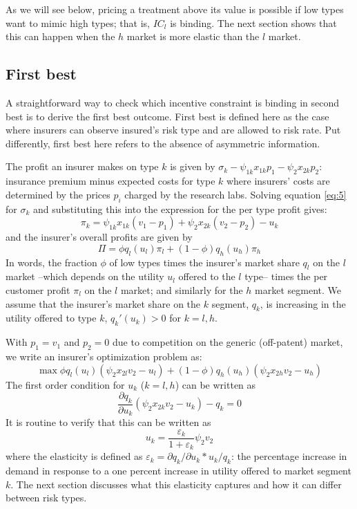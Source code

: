 \documentclass[a4paper,12pt]{article}
\begin{document}
As we will see below, pricing a treatment above its value is possible if low types want to mimic high types; that is, \(IC_l\) is binding. The next section shows that this can happen when the \(h\) market is more elastic than the \(l\) market.

\subsection{First best}
\label{sec:org7e55ff0}

A straightforward way to check which incentive constraint is binding in second best is to derive the first best outcome. First best is defined here as the case where insurers can observe insured's risk type and are allowed to risk rate. Put differently, first best here refers to the absence of asymmetric information.

The profit an insurer makes on type \(k\) is given by \(\sigma_k - \psi_{1k}x_{1k}p_1 - \psi_{2}x_{2k}p_2\): insurance premium minus expected costs for type \(k\) where insurers' costs are determined by the prices \(p_{i}\) charged by the research labs. Solving equation \eqref{eq:5} for \(\sigma_{k}\) and substituting this into the expression for the per type profit gives:
\begin{equation}
\label{eq:6}
\pi_k = \psi_{1k}x_{1k}(v_1-p_1)+\psi_{2}x_{2k}(v_2-p_2)-u_k
\end{equation}
and the insurer's overall profits are given by
\begin{equation}
\label{eq:7}
\Pi = \phi q_l(u_l) \pi_l +(1-\phi)q_h(u_h) \pi_h
\end{equation}
In words, the fraction \(\phi\) of low types times the insurer's market share \(q_l\) on the \(l\) market --which depends on the utility \(u_l\) offered to the \(l\) type-- 
times the per customer profit \(\pi_l\) on the \(l\) market; and similarly for the \(h\) market segment. We assume that the insurer's market share on the \(k\) segment, \(q_k\), is increasing in the utility offered to type \(k\), \(q_k'(u_k)>0\) for \(k=l,h\). 

With \(p_1=v_1\) and \(p_2=0\) due to competition on the generic (off-patent) market, we write an insurer's optimization problem as:
\begin{equation}
\max \phi q_l(u_l) (\psi_2 x_{2l} v_2 -u_l) + (1-\phi) q_h(u_h) (\psi_2 x_{2h} v_2 -u_h)
\end{equation}
The first order condition for \(u_k\) (\(k=l,h\)) can be written as
\begin{equation}
\frac{\partial q_{k}}{\partial u_{k}} (\psi_2 x_{2k} v_2 - u_k) - q_k = 0
\end{equation}
It is routine to verify that this can be written as
\begin{equation}
\label{eq:elastEquation}
u_k = \frac{\varepsilon_{k}}{1+\varepsilon_{k}}\psi_2 v_2
\end{equation}
where the elasticity is defined as \(\varepsilon_k = \partial q_k/\partial u_k * u_k/q_k\): the percentage increase in demand in response to a one percent increase in utility offered to market segment \(k\). The next section discusses what this elasticity captures and how it can differ between risk types.
\end{document}
